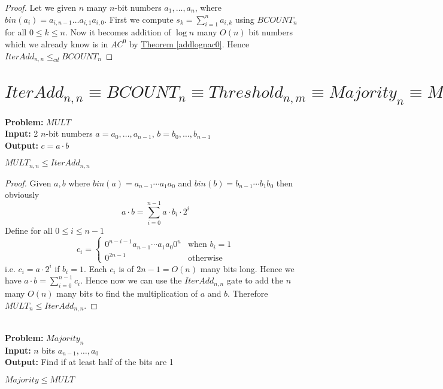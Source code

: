 \begin{proof}
Let we given $n$ many $n$-bit numbers $a_1,\dots,a_n$, where $bin(a_i)=a_{i,n-1}\dots a_{i,1}a_{i,0}$. First we compute $s_{k}=\sum_{i=1}^n a_{i,k}$ using $BCOUNT_n$ for all $0\leq k\leq n$. Now it becomes addition of $\log n$ many $O(n)$ bit numbers which we already know is in $AC^0$ by \hyperref[addlognac0]{Theorem \ref{addlognac0}}. Hence $IterAdd_{n,n}\leq_{cd} BCOUNT_n$
\end{proof}


\section{$IterAdd_{n,n}\equiv BCOUNT_n\equiv Threshold_{n,m} \equiv Majority_n\equiv MULT_{n}\equiv SORT_{n,n}$}
\textbf{Problem:} $MULT$\\
\textbf{Input:} 2 $n$-bit numbers $a=a_0,\dots,a_{n-1}$, $b=b_0,\dots,b_{n-1}$\\
\textbf{Output:} $c=a\cdot b$\\
\begin{theorem}\label{multaddrel}
	$MULT_{n,n}\leq IterAdd_{n,n}$
\end{theorem}
\begin{proof}
	Given $a,b$ where $bin(a)=a_{n-1}\cdots a_1a_0$ and $bin(b)=b_{n-1}\cdots b_1b_0$ then obviously $$a\cdot b=\sum_{i=0}^{n-1}a\cdot b_i\cdot 2^i$$Define for all $0\leq i\leq n-1$ $$c_i=\begin{cases}
		0^{n-i-1}a_{n-1}\cdots a_1a_0 0^u & \text{when $b_i=1$}\\
		0^{2n-1} & \text{otherwise}
	\end{cases}$$i.e. $c_i=a\cdot 2^i$ if $b_i=1$. Each $c_i$ is of $2n-1=O(n) $ many bits long. Hence we have $a\cdot b=\sum_{i=0}^{n-1} c_i$. Hence now we can use the $IterAdd_{n,n}$ gate to add the $n$ many $O(n)$ many bits to find the multiplication of $a$ and $b$. Therefore $MULT_n\leq IterAdd_{n,n}$.
\end{proof}\\
\textbf{Problem:} $Majority_n$\\
\textbf{Input:} $n$ bits $a_{n-1},\dots, a_0$\\
\textbf{Output:} Find if at least half of the bits are 1\\
\begin{theorem}\label{majmultrel}
	$Majority\leq MULT$
\end{theorem}

